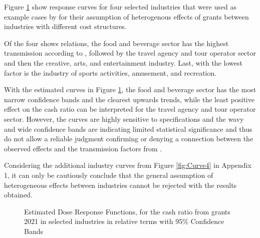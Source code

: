 Figure \ref{fig:Curve3} show response curves for four selected industries that were used as example cases by \parencite{bischof_bedeutung_2021} for their assumption of heterogenous effects of grants between industries with different cost structures.


Of the four shows relations, the food and beverage sector has the highest transmission according to \parencite{bischof_bedeutung_2021}, followed by the travel agency and tour operator sector and then the creative, arts, and entertainment industry. Last, with the lowest factor is the industry of sports activities, amusement, and recreation.

With the estimated curves in Figure \ref{fig:Curve3}, the food and beverage sector has the most narrow confidence bands and the clearest upwards trends, while the least positive effect on the cash ratio can be interpreted for the travel agency and tour operator sector. However, the curves are highly sensitive to specifications and the wavy and wide confidence bands are indicating limited statistical significance and thus do not allow a reliable judgment confirming or denying a connection between the observed effects and the transmission factors from \parencite{bischof_bedeutung_2021}. 

Considering the additional industry curves from Figure \ref{fig:Curve4} in Appendix 1, it can only be cautiously conclude that the general assumption of heterogeneous effects between industries cannot be rejected with the results obtained.




\begin{figure}
    \centering
    
    \decoRule
    \caption[Response curves for liquidity through aid - by sectors 1]{Estimated Dose Response Functions, for the cash ratio from grants 2021 in selected industries in relative terms with 95\% Confidence Bands}
    \label{fig:Curve3}
\end{figure}



